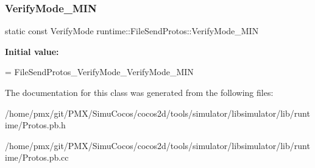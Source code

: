 \subsubsection{\texorpdfstring{Verify\+Mode\+\_\+\+M\+IN}{VerifyMode\_MIN}}
{\footnotesize\ttfamily static const Verify\+Mode runtime\+::\+File\+Send\+Protos\+::\+Verify\+Mode\+\_\+\+M\+IN\hspace{0.3cm}{\ttfamily [static]}}

{\bfseries Initial value\+:}
\begin{DoxyCode}
=
    FileSendProtos\_VerifyMode\_VerifyMode\_MIN
\end{DoxyCode}


The documentation for this class was generated from the following files\+:\begin{DoxyCompactItemize}
\item 
/home/pmx/git/\+P\+M\+X/\+Simu\+Cocos/cocos2d/tools/simulator/libsimulator/lib/runtime/Protos.\+pb.\+h\item 
/home/pmx/git/\+P\+M\+X/\+Simu\+Cocos/cocos2d/tools/simulator/libsimulator/lib/runtime/Protos.\+pb.\+cc\end{DoxyCompactItemize}
